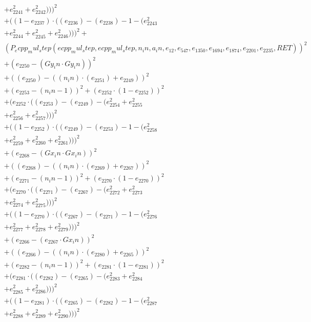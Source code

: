 \documentclass[10pt, a4paper]{article}
\begin{document}
\begin{align*}
& + e_{2241}^{2} + e_{2242}^{2})))^{2} \\
& + ((1 - e_{2237})  \cdot  ((e_{2236}) - (e_{2238}) - 1 - (e_{2243}^{2} \\
& + e_{2244}^{2} + e_{2245}^{2} + e_{2246}^{2})))^{2} + \\
& (P_ecpp_mul_step(ecpp_mul_step, ecpp_mul_step, n_in, a_in, e_{12}, e_{547}, e_{1350}, e_{1694}, e_{1874}, e_{2201}, e_{2235}, RET))^{2} \\
& + (e_{2250} - (Gy_in  \cdot  Gy_in))^{2} \\
& + ((e_{2250}) - ((n_in)  \cdot  (e_{2251}) + e_{2249}))^{2} \\
& + (e_{2253} - (n_in - 1))^{2} + (e_{2252}  \cdot  (1 - e_{2252}))^{2} \\
& + (e_{2252}  \cdot  ((e_{2253}) - (e_{2249}) - (e_{2254}^{2} + e_{2255}^{2} \\
& + e_{2256}^{2} + e_{2257}^{2})))^{2} \\
& + ((1 - e_{2252})  \cdot  ((e_{2249}) - (e_{2253}) - 1 - (e_{2258}^{2} \\
& + e_{2259}^{2} + e_{2260}^{2} + e_{2261}^{2})))^{2} \\
& + (e_{2268} - (Gx_in  \cdot  Gx_in))^{2} \\
& + ((e_{2268}) - ((n_in)  \cdot  (e_{2269}) + e_{2267}))^{2} \\
& + (e_{2271} - (n_in - 1))^{2} + (e_{2270}  \cdot  (1 - e_{2270}))^{2} \\
& + (e_{2270}  \cdot  ((e_{2271}) - (e_{2267}) - (e_{2272}^{2} + e_{2273}^{2} \\
& + e_{2274}^{2} + e_{2275}^{2})))^{2} \\
& + ((1 - e_{2270})  \cdot  ((e_{2267}) - (e_{2271}) - 1 - (e_{2276}^{2} \\
& + e_{2277}^{2} + e_{2278}^{2} + e_{2279}^{2})))^{2} \\
& + (e_{2266} - (e_{2267}  \cdot  Gx_in))^{2} \\
& + ((e_{2266}) - ((n_in)  \cdot  (e_{2280}) + e_{2265}))^{2} \\
& + (e_{2282} - (n_in - 1))^{2} + (e_{2281}  \cdot  (1 - e_{2281}))^{2} \\
& + (e_{2281}  \cdot  ((e_{2282}) - (e_{2265}) - (e_{2283}^{2} + e_{2284}^{2} \\
& + e_{2285}^{2} + e_{2286}^{2})))^{2} \\
& + ((1 - e_{2281})  \cdot  ((e_{2265}) - (e_{2282}) - 1 - (e_{2287}^{2} \\
& + e_{2288}^{2} + e_{2289}^{2} + e_{2290}^{2})))^{2} \\

\end{align*}
\end{document}
